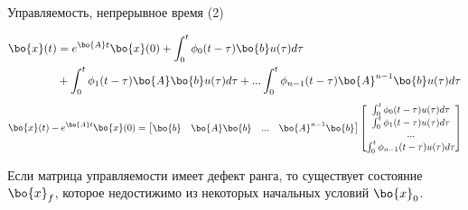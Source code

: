 \documentclass{beamer}
\begin{document}
\begin{frame}{Управляемость, непрерывное время (2)}
	\begin{flushleft}
		
		\begin{align*}
			\bo{x}(t) &= e^{\bo{A}t}  \bo{x}(0) + 
			\int_{0}^{t} \phi_0(t-\tau)\bo{b} u(\tau) d\tau
			\\
			&+
			\int_{0}^{t} \phi_1(t-\tau)\bo{A}\bo{b}  u(\tau) d\tau+ ... 
			\int_{0}^{t} \phi_{n-1}(t-\tau) \bo{A}^{n-1} 
			\bo{b}  u(\tau) d\tau 
		\end{align*}
		\begin{align*}
			\bo{x}(t) -  e^{\bo{A}t}  \bo{x}(0) = 
			\begin{bmatrix}
				\bo{b} & \bo{A}\bo{b}& ... &\bo{A}^{n-1}\bo{b}
			\end{bmatrix}
			\begin{bmatrix}
				\int_{0}^{t} \phi_0(t-\tau) u(\tau) d\tau \\
				\int_{0}^{t} \phi_1(t-\tau) u(\tau) d\tau \\
				... \\
				\int_{0}^{t} \phi_{n-1}(t-\tau) u(\tau) d\tau \\
			\end{bmatrix}
		\end{align*}
		
		Если матрица управляемости имеет дефект ранга, то существует состояние $\bo{x}_f$, которое недостижимо из некоторых начальных условий $\bo{x}_0$.
		
	\end{flushleft}
\end{frame}
\end{document}
